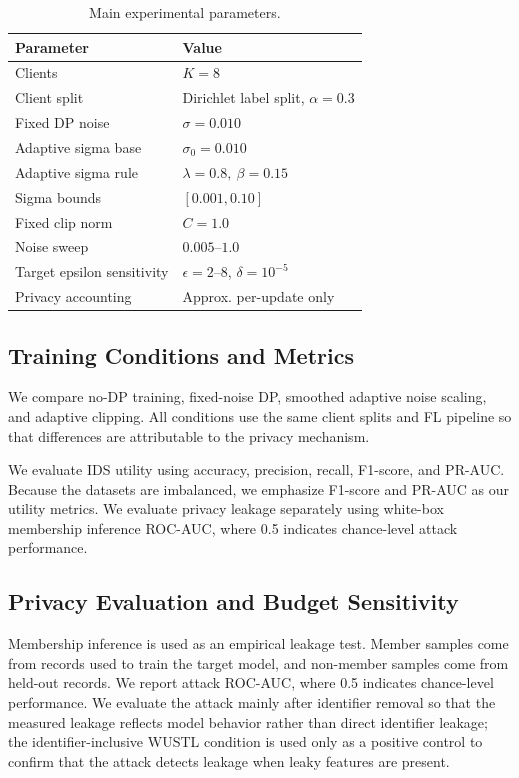 \documentclass[conference]{IEEEtran}
\begin{document}
\begin{table}[!t]
\centering
\caption{Main experimental parameters.}
\label{tab:exp_params}
\renewcommand{\arraystretch}{1.12}
\begin{tabular}{ll}
\hline
\textbf{Parameter} & \textbf{Value} \\
\hline
Clients & \(K=8\) \\
Client split & Dirichlet label split, \(\alpha=0.3\) \\
Fixed DP noise & \(\sigma=0.010\) \\
Adaptive sigma base & \(\sigma_0=0.010\) \\
Adaptive sigma rule & \(\lambda=0.8,\ \beta=0.15\) \\
Sigma bounds & \([0.001,0.10]\) \\
Fixed clip norm & \(C=1.0\) \\
Noise sweep & \(0.005\)--\(1.0\) \\
Target epsilon sensitivity & \(\epsilon=2\)--8, \(\delta=10^{-5}\) \\
Privacy accounting & Approx. per-update only \\
\hline
\end{tabular}
\end{table}

\subsection{Training Conditions and Metrics}

We compare no-DP training, fixed-noise DP, smoothed adaptive noise scaling, and
adaptive clipping. All conditions use the same client splits and FL pipeline so
that differences are attributable to the privacy mechanism.

We evaluate IDS utility using accuracy, precision, recall, F1-score, and PR-AUC.
Because the datasets are imbalanced, we emphasize F1-score and PR-AUC as our
utility metrics. We evaluate privacy leakage separately using white-box
membership inference ROC-AUC, where 0.5 indicates chance-level attack
performance.

\subsection{Privacy Evaluation and Budget Sensitivity}

Membership inference is used as an empirical leakage test. Member samples come
from records used to train the target model, and non-member samples come from
held-out records. We report attack ROC-AUC, where 0.5 indicates chance-level
performance. We evaluate the attack mainly after identifier removal so that the
measured leakage reflects model behavior rather than direct identifier leakage;
the identifier-inclusive WUSTL condition is used only as a positive control to
confirm that the attack detects leakage when leaky features are present.
\end{document}
